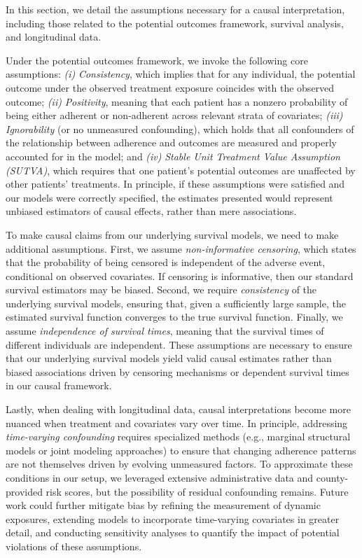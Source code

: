 In this section, we detail the assumptions necessary for a causal interpretation, including those related to the potential outcomes framework, survival analysis, and longitudinal data.

Under the potential outcomes framework, we invoke the following core assumptions:
\textit{(i)} \emph{Consistency}, which implies that for any individual, the potential outcome under the observed treatment exposure coincides with the observed outcome;
\textit{(ii)} \emph{Positivity}, meaning that each patient has a nonzero probability of being either adherent or non-adherent across relevant strata of covariates;
\textit{(iii)} \emph{Ignorability} (or no unmeasured confounding), which holds that all confounders of the relationship between adherence and outcomes are measured and properly accounted for in the model; and 
\textit{(iv)} \emph{Stable Unit Treatment Value Assumption (SUTVA)}, which requires that one patient’s potential outcomes are unaffected by other patients’ treatments. 
In principle, if these assumptions were satisfied and our models were correctly specified, the estimates presented would represent unbiased estimators of causal effects, rather than mere associations.

To make causal claims from our underlying survival models, we need to make additional assumptions.
First, we assume \emph{non-informative censoring}, which states that the probability of being censored is independent of the adverse event, conditional on observed covariates.
If censoring is informative, then our standard survival estimators may be biased.
Second, we require \emph{consistency} of the underlying survival models,  ensuring that, given a sufficiently large sample, the estimated survival function converges to the true survival function.
Finally, we assume \emph{independence of survival times}, meaning that the survival times of different individuals are independent.
These assumptions are necessary to ensure that our underlying survival models yield valid causal estimates rather than biased associations driven by censoring mechanisms or dependent survival times in our causal framework.

Lastly, when dealing with longitudinal data, causal interpretations become more nuanced when treatment and covariates vary over time.
In principle, addressing \emph{time-varying confounding} requires specialized methods (e.g., marginal structural models or joint modeling approaches) to ensure that changing adherence patterns are not themselves driven by evolving unmeasured factors.
To approximate these conditions in our setup, we leveraged extensive administrative data and county-provided risk scores, but the possibility of residual confounding remains.
Future work could further mitigate bias by refining the measurement of dynamic exposures, extending models to incorporate time-varying covariates in greater detail, and conducting sensitivity analyses to quantify the impact of potential violations of these assumptions.


